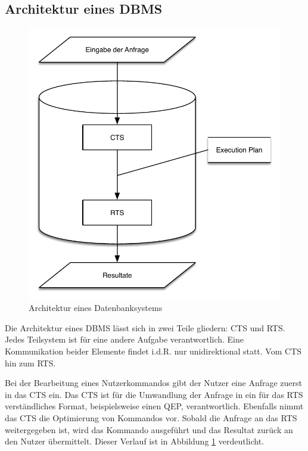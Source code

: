 \subsection{Architektur eines \ac{DBMS}}



\begin{figure}[ht]
  \centering
  \includegraphics{02_Related_Work/CTS_RTS.pdf}
  \caption{Architektur eines Datenbanksystems}
  \label{Database_Architecture}
\end{figure}

Die Architektur eines \ac{DBMS} lässt sich in zwei Teile gliedern: \ac{CTS} und \ac{RTS}. Jedes Teilsystem ist für eine andere Aufgabe verantwortlich. Eine Kommunikation beider Elemente findet i.d.R. nur unidirektional statt. Vom \ac{CTS} hin zum \ac{RTS}.

Bei der Bearbeitung eines Nutzerkommandos gibt der Nutzer eine Anfrage zuerst in das \ac{CTS} ein. Das \ac{CTS} ist für die Umwandlung der Anfrage in ein für das \ac{RTS} verständliches Format, beispielsweise einen \ac{QEP}, verantwortlich. Ebenfalls nimmt das \ac{CTS} die Optimierung von Kommandos vor. Sobald die Anfrage an das \ac{RTS} weitergegeben ist, wird das Kommando ausgeführt und das Resultat zurück an den Nutzer übermittelt. Dieser Verlauf ist in Abbildung \ref{Database_Architecture} verdeutlicht.


